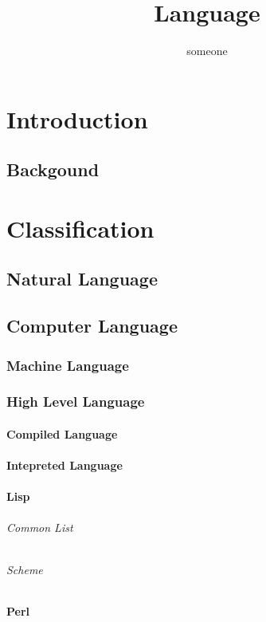\documentclass{book}
\title{Language}
\author{someone}
\begin{document}
\maketitle
\tableofcontents
\part{Introduction}
	\chapter{Backgound}
\part{Classification}
	\chapter{Natural Language}
	\chapter{Computer Language}
		\section{Machine Language}
		\section{High Level Language}
			\subsection{Compiled Language}
			\subsection{Intepreted Language}
			\subsection{Lisp}
				\paragraph{Common List}
				\paragraph{Scheme}
			\subsection{Perl}
\end{document}

